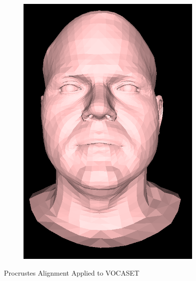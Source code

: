 \begin{figure}[h]
\begin{subfigure}[b]{0.4\textwidth}
        \includegraphics[width=\textwidth]{figures/dataset/subject2_aligned.png}
    \end{subfigure}
    \caption{Procrustes Alignment Applied to VOCASET \cite{Cudeiro2019}}\label{fig:VOCASET_Alignment}
\end{figure}